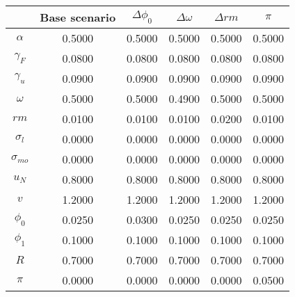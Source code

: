 \begin{tabular}{cccccc}
\toprule
{} &  Base scenario &  $\Delta \phi_0$ &  $\Delta \omega$ &  $\Delta rm$ &  $\pi$ \\
\midrule
\textbf{$\alpha$     } &         0.5000 &           0.5000 &           0.5000 &       0.5000 & 0.5000 \\
\textbf{$\gamma_F$   } &         0.0800 &           0.0800 &           0.0800 &       0.0800 & 0.0800 \\
\textbf{$\gamma_u$   } &         0.0900 &           0.0900 &           0.0900 &       0.0900 & 0.0900 \\
\textbf{$\omega$     } &         0.5000 &           0.5000 &           0.4900 &       0.5000 & 0.5000 \\
\textbf{$rm$         } &         0.0100 &           0.0100 &           0.0100 &       0.0200 & 0.0100 \\
\textbf{$\sigma_{l}$ } &         0.0000 &           0.0000 &           0.0000 &       0.0000 & 0.0000 \\
\textbf{$\sigma_{mo}$} &         0.0000 &           0.0000 &           0.0000 &       0.0000 & 0.0000 \\
\textbf{$u_N$        } &         0.8000 &           0.8000 &           0.8000 &       0.8000 & 0.8000 \\
\textbf{$v$          } &         1.2000 &           1.2000 &           1.2000 &       1.2000 & 1.2000 \\
\textbf{$\phi_0$     } &         0.0250 &           0.0300 &           0.0250 &       0.0250 & 0.0250 \\
\textbf{$\phi_1$     } &         0.1000 &           0.1000 &           0.1000 &       0.1000 & 0.1000 \\
\textbf{$R$          } &         0.7000 &           0.7000 &           0.7000 &       0.7000 & 0.7000 \\
\textbf{$\pi$        } &         0.0000 &           0.0000 &           0.0000 &       0.0000 & 0.0500 \\
\bottomrule
\end{tabular}

